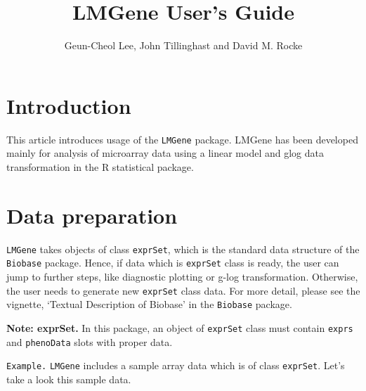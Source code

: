 \documentclass[11pt]{article}
\begin{document}
\title{\bf LMGene User's Guide}
\author{Geun-Cheol Lee, John Tillinghast and David M. Rocke}

\maketitle

\tableofcontents

\section{Introduction}

This article introduces usage of the \texttt{LMGene} package. 
LMGene has been developed mainly for analysis of microarray data using 
a linear model and glog data transformation in the R statistical package.


\section{Data preparation}
\texttt{LMGene}  takes objects of class \texttt{exprSet}, which is the standard data structure of the \texttt{Biobase} package.
Hence, if data which is \texttt{exprSet} class is ready, the user can jump to further
steps, like diagnostic plotting or g-log transformation.
Otherwise, the user needs to generate new \texttt{exprSet} class data.
For more detail, please see the vignette, `Textual Description of Biobase' in the \texttt{Biobase} package.

{\bf Note: exprSet.} In this package, an object of \texttt{exprSet} class must contain
\texttt{exprs} and \texttt{phenoData} slots with proper data.

{\tt Example.} \texttt{LMGene} includes a sample array data which is of class {\tt exprSet}.
Let's take a look this sample data.
\end{document}
